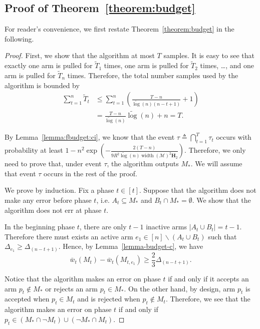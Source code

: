 \documentclass{article}
\newcommand{\M}{\mathcal M}
\newcommand{\del}{\backslash}
\DeclareMathOperator{\rank}{width}
\newcommand{\barlog}{\tilde{\log}}
\begin{document}
\subsection{Proof of Theorem~\ref{theorem:budget}}

For reader's convenience, we first restate Theorem~\ref{theorem:budget} in the following.
\realfixbudget*

\begin{proof}
First, we show that the algorithm at most $T$ samples.
It is easy to see that exactly one arm is pulled for $\tilde T_1$ times, one arm is pulled for $\tilde T_2$ times, \ldots, and one arm is pulled for $\tilde T_n$ times. 
Therefore, the total number samples used by the algorithm is bounded by
\begin{align*}
\sum_{t=1}^n \tilde T_t 
&\le \sum_{t=1}^n \left(\frac{T-n}{\barlog(n)(n-t+1)} +1\right)\\
&= \frac{T-n}{\barlog(n)}\barlog(n)+n = T.
\end{align*}



By Lemma~\ref{lemma:fbudget:ci}, we know that the event $\tau \triangleq \bigcap_{t=1}^T \tau_t$ occurs with probability at least
$1-n^2  \exp\left(-\frac{2(T-n)}{9R^2 \barlog(n) \rank(\M)^2 \mathbf H_2} \right)$.
Therefore, we only need to prove that, under event $\tau$, the algorithm outputs $M_*$.
We will assume that event $\tau$ occurs in the rest of the proof.


We prove by induction. Fix a phase $t \in [t]$.
Suppose that the algorithm does not make any error before phase $t$, i.e. $A_t \subseteq M_*$ and $B_t \cap M_* = \emptyset$.
We show that the algorithm does not err at phase $t$.

In the beginning phase $t$, there are only $t-1$ inactive arms $|A_t \cup B_t| = t-1$. 
Therefore there must exists an active arm $e_1 \in [n]\del (A_t\cup B_t)$ such that 
$\Delta_{e_1} \ge \Delta_{(n-t+1)}$.
Hence, by Lemma~\ref{lemma-budget-c}, we have
\begin{equation}
\label{eq-fbdg-upper}
\bar w_t(M_t)- \bar w_t(M_{t,e_1}) \ge \frac23\Delta_{(n-t+1)}.
\end{equation}

Notice that the algorithm makes an error on phase $t$ if and only if it accepts an arm $p_t \not\in M_*$ or rejects an arm $p_t \in M_*$.
On the other hand, by design, arm $p_t$ is accepted when $p_t\in M_t$ and  is rejected when $p_t \not \in M_t$.
Therefore, we see that the algorithm makes an error on phase $t$ if and only if
$p_t \in (M_* \cap \neg M_t) \cup (\neg M_* \cap M_t)$.


\end{proof}
\end{document}
